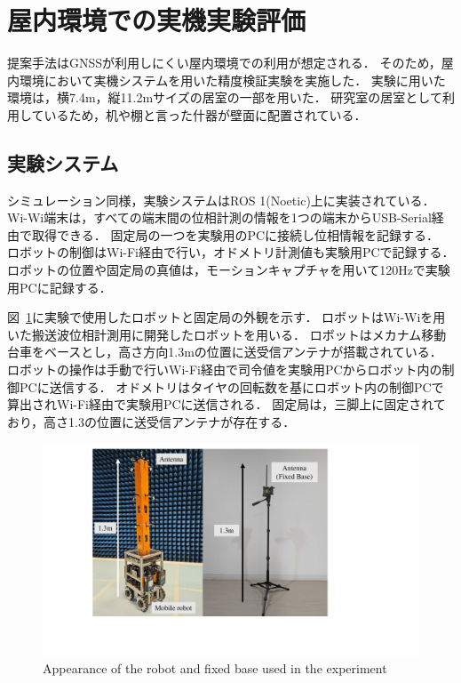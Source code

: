 \documentclass[a4jsme]{jsmepaper}
\newcommand\figref[1]{図~\ref{fig:#1}}
\begin{document}
\section{屋内環境での実機実験評価}
提案手法はGNSSが利用しにくい屋内環境での利用が想定される．
そのため，屋内環境において実機システムを用いた精度検証実験を実施した．
実験に用いた環境は，横7.4m，縦11.2mサイズの居室の一部を用いた．
研究室の居室として利用しているため，机や棚と言った什器が壁面に配置されている．
\subsection{実験システム}
シミュレーション同様，実験システムはROS 1(Noetic)上に実装されている．
Wi-Wi端末は，すべての端末間の位相計測の情報を1つの端末からUSB-Serial経由で取得できる．
固定局の一つを実験用のPCに接続し位相情報を記録する．
ロボットの制御はWi-Fi経由で行い，オドメトリ計測値も実験用PCで記録する．
ロボットの位置や固定局の真値は，モーションキャプチャを用いて120Hzで実験用PCに記録する．

\figref{robot}に実験で使用したロボットと固定局の外観を示す．
ロボットはWi-Wiを用いた搬送波位相計測用に開発したロボットを用いる．
ロボットはメカナム移動台車をベースとし，高さ方向1.3mの位置に送受信アンテナが搭載されている．
ロボットの操作は手動で行いWi-Fi経由で司令値を実験用PCからロボット内の制御PCに送信する．
オドメトリはタイヤの回転数を基にロボット内の制御PCで算出されWi-Fi経由で実験用PCに送信される．
固定局は，三脚上に固定されており，高さ1.3の位置に送受信アンテナが存在する．

\begin{figure}
    \centering
    \includegraphics[width=0.95\linewidth]{figures/robot}
    \caption{Appearance of the robot and fixed base used in the experiment}
    \label{fig:robot}
\end{figure}
\end{document}
